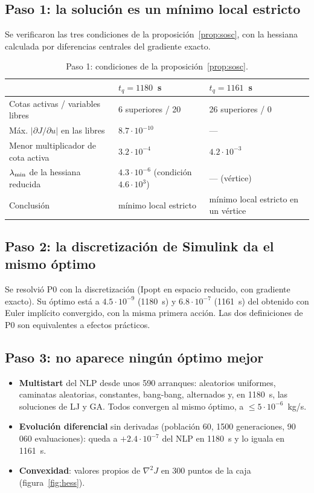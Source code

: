 \subsection{Paso 1: la solución es un mínimo local estricto}
Se verificaron las tres condiciones de la proposición~\ref{prop:sosc}, con la hessiana
calculada por diferencias centrales del gradiente exacto.

\begin{table}[H]\centering\small
\begin{tabularx}{\linewidth}{@{}l Y Y@{}}\toprule
& $t_q=1180$~s & $t_q=1161$~s\\\midrule
Cotas activas / variables libres & 6 superiores / 20 & 26 superiores / 0\\
Máx. $|\partial J/\partial u|$ en las libres & $8.7\cdot10^{-10}$ & ---\\
Menor multiplicador de cota activa & $3.2\cdot10^{-4}$ & $4.2\cdot10^{-3}$\\
$\lambda_{\rm min}$ de la hessiana reducida & $4.3\cdot10^{-6}$ (condición $4.6\cdot10^3$) & --- (vértice)\\
Conclusión & mínimo local estricto & mínimo local estricto en un vértice\\\bottomrule
\end{tabularx}
\caption{Paso 1: condiciones de la proposición~\ref{prop:sosc}.}
\end{table}

\subsection{Paso 2: la discretización de Simulink da el mismo óptimo}
Se resolvió P0 con la discretización  (Ipopt en espacio reducido, con
gradiente exacto). Su óptimo está a $4.5\cdot10^{-9}$ (1180~s) y $6.8\cdot10^{-7}$ (1161~s)
del obtenido con Euler implícito convergido, con la misma primera acción. Las dos
definiciones de P0 son equivalentes a efectos prácticos.

\subsection{Paso 3: no aparece ningún óptimo mejor}
\begin{itemize}
  \item \textbf{Multistart} del NLP desde unos 590 arranques: aleatorios uniformes,
        caminatas aleatorias, constantes, bang-bang, alternados y, en 1180~s, las soluciones
        de LJ y GA. Todos convergen al mismo óptimo, a $\le5\cdot10^{-6}$~kg/s.
  \item \textbf{Evolución diferencial} sin derivadas (población 60, 1500 generaciones,
        90\,060 evaluaciones): queda a $+2.4\cdot10^{-7}$ del NLP en 1180~s y lo iguala en
        1161~s.
  \item \textbf{Convexidad}: valores propios de $\nabla^2J$ en 300 puntos de la caja
        (figura~\ref{fig:hess}).
\end{itemize}

